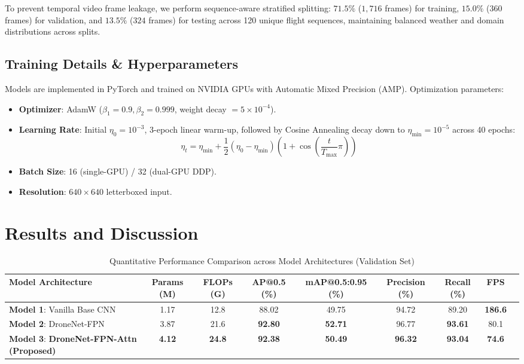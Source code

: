 \documentclass[10pt,conference,letterpaper,twocolumn]{article}
\begin{document}
To prevent temporal video frame leakage, we perform sequence-aware stratified splitting: $71.5\%$ ($1,716$ frames) for training, $15.0\%$ ($360$ frames) for validation, and $13.5\%$ ($324$ frames) for testing across 120 unique flight sequences, maintaining balanced weather and domain distributions across splits.

\subsection{Training Details \& Hyperparameters}
Models are implemented in PyTorch and trained on NVIDIA GPUs with Automatic Mixed Precision (AMP). Optimization parameters:
\begin{itemize}
    \item \textbf{Optimizer}: AdamW ($\beta_1=0.9, \beta_2=0.999$, weight decay $= 5\times 10^{-4}$).
    \item \textbf{Learning Rate}: Initial $\eta_0 = 10^{-3}$, 3-epoch linear warm-up, followed by Cosine Annealing decay down to $\eta_{\text{min}} = 10^{-5}$ across 40 epochs:
    \begin{equation}
    \eta_t = \eta_{\text{min}} + \frac{1}{2}(\eta_0 - \eta_{\text{min}})\left(1 + \cos\left(\frac{t}{T_{\text{max}}}\pi\right)\right)
    \end{equation}
    \item \textbf{Batch Size}: 16 (single-GPU) / 32 (dual-GPU DDP).
    \item \textbf{Resolution}: $640\times 640$ letterboxed input.
\end{itemize}

\section{Results and Discussion}

\begin{table}[t]
\centering
\caption{Quantitative Performance Comparison across Model Architectures (Validation Set)}
\label{tab:benchmark}
\begin{tabular}{@{}lcccccccc@{}}
\toprule
\textbf{Model Architecture} & \textbf{Params (M)} & \textbf{FLOPs (G)} & \textbf{AP@0.5 (\%)} & \textbf{mAP@0.5:0.95 (\%)} & \textbf{Precision (\%)} & \textbf{Recall (\%)} & \textbf{FPS} \\
\midrule
\textbf{Model 1}: Vanilla Base CNN & 1.17 & 12.8 & 88.02 & 49.75 & 94.72 & 89.20 & \textbf{186.6} \\
\textbf{Model 2}: DroneNet-FPN & 3.87 & 21.6 & \textbf{92.80} & \textbf{52.71} & 96.77 & \textbf{93.61} & 80.1 \\
\textbf{Model 3}: \textbf{DroneNet-FPN-Attn (Proposed)} & \textbf{4.12} & \textbf{24.8} & \textbf{92.38} & \textbf{50.49} & \textbf{96.32} & \textbf{93.04} & \textbf{74.6} \\
\bottomrule
\end{tabular}
\end{table}
\end{document}
